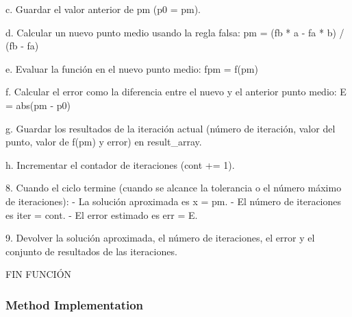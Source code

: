 \documentclass{article}
\begin{document}
        c. Guardar el valor anterior de pm (p0 = pm).

        d. Calcular un nuevo punto medio usando la regla falsa:
           pm = (fb * a - fa * b) / (fb - fa)

        e. Evaluar la función en el nuevo punto medio:
           fpm = f(pm)

        f. Calcular el error como la diferencia entre el nuevo y el anterior punto medio:
           E = abs(pm - p0)

        g. Guardar los resultados de la iteración actual (número de iteración, valor del punto, valor de f(pm) y error) en result_array.

        h. Incrementar el contador de iteraciones (cont += 1).

    8. Cuando el ciclo termine (cuando se alcance la tolerancia o el número máximo de iteraciones):
        - La solución aproximada es x = pm.
        - El número de iteraciones es iter = cont.
        - El error estimado es err = E.

    9. Devolver la solución aproximada, el número de iteraciones, el error y el conjunto de resultados de las iteraciones.

FIN FUNCIÓN

        \subsubsection{Method Implementation}
\end{document}
